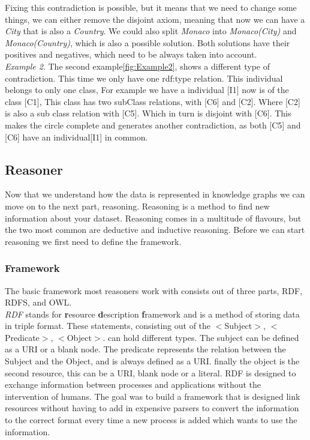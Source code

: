 \documentclass{article}
\begin{document}
Fixing this contradiction is possible, but it means that we need to change some things, we can either remove the disjoint axiom, meaning that now we can have a \textit{City} that is also a \textit{Country}. We could also split \textit{Monaco} into \textit{Monaco(City)} and \textit{Monaco(Country)}, which is also a possible solution. Both solutions have their positives and negatives, which need to be always taken into account.\\

\textit{Example 2}. The second example\ref{fig:Example2}, shows a different type of contradiction. This time we only have one rdf:type relation. This individual belongs to only one class, For example we have a individual \textit{}[I1] now is of the class \textit{ }[C1], This class has two subClass relations, with \textit{ }[C6] and \textit{ }[C2]. Where \textit{ }[C2] is also a sub class relation with \textit{ }[C5]. Which in turn is disjoint with \textit{ }[C6]. This makes the circle complete and generates another contradiction, as both \textit{ }[C5] and \textit{ }[C6] have an individual[I1] in common. \\


\subsection{Reasoner}
Now that we understand how the data is represented in knowledge graphs we can move on to the next part, reasoning. Reasoning is a method to find new information about your dataset. Reasoning comes in a multitude of flavours, but the two most common are deductive and inductive reasoning. Before we can start reasoning we first need to define the framework.

\subsubsection{Framework}
The basic framework most reasoners work with consists out of three parts, RDF, RDFS, and OWL. \\

\textit{RDF} \cite{rdfPrimer:2014} stands for \textbf{r}esource \textbf{d}escription \textbf{f}ramework and is a method of storing data in triple format. These statements, consisting out of the $<$Subject$>$, $<$Predicate$>$, $<$Object$>$. can hold different types. The subject can be defined as a URI or a blank node. The predicate represents the relation between the Subject and the Object, and is always defined as a URI. finally the object is the second resource, this can be a URI, blank node or a literal.
RDF is designed to exchange information between processes and applications without the intervention of humans. The goal was to build a framework that is designed link resources without having to add in expensive parsers to convert the information to the correct format every time a new process is added which wants to use the information.\\
\end{document}
